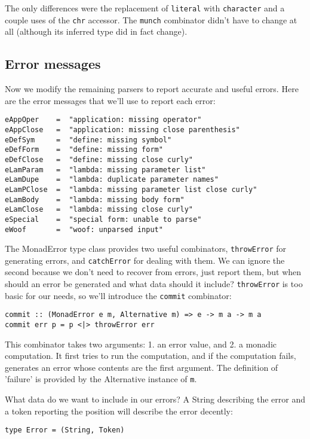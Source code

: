 \documentclass{tmr}
\begin{document}
The only differences were the replacement of \verb+literal+ with \verb+character+ 
and a couple uses of the \verb+chr+ accessor.  The \verb+munch+ combinator didn't 
have to change at all (although its inferred type did in fact change).

\subsection{Error messages}
Now we modify the remaining parsers to report accurate and useful errors.
Here are the error messages that we'll use to report each error:
\begin{verbatim}
eAppOper    =  "application: missing operator"
eAppClose   =  "application: missing close parenthesis"
eDefSym     =  "define: missing symbol"
eDefForm    =  "define: missing form"
eDefClose   =  "define: missing close curly"
eLamParam   =  "lambda: missing parameter list"
eLamDupe    =  "lambda: duplicate parameter names"
eLamPClose  =  "lambda: missing parameter list close curly"
eLamBody    =  "lambda: missing body form"
eLamClose   =  "lambda: missing close curly"
eSpecial    =  "special form: unable to parse"
eWoof       =  "woof: unparsed input"
\end{verbatim}

The MonadError type class provides two useful combinators, \verb+throwError+ for 
generating errors, and \verb+catchError+ for dealing with them.  We can ignore 
the second because we don't need to recover from errors, just report them, 
but when should an error be generated and what 
data should it include?  \verb+throwError+ is too basic for our needs, so we'll 
introduce the \verb+commit+ combinator:
\begin{verbatim}
commit :: (MonadError e m, Alternative m) => e -> m a -> m a
commit err p = p <|> throwError err
\end{verbatim}

This combinator takes two arguments: 1. an error value, and 2. a monadic 
computation.  It first tries to run the computation, and if the computation 
fails, generates an error whose contents are the first argument.  The 
definition of 'failure' is provided by the Alternative instance of \verb+m+.

What data do we want to include in our errors?  A String describing the error 
and a token reporting the position will describe the error decently:
\begin{verbatim}
type Error = (String, Token)
\end{verbatim}
\end{document}
